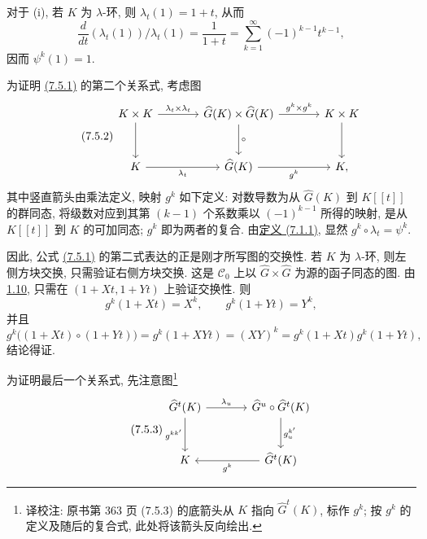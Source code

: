 对于 (i), 若 \(K\) 为 \(\lambda\)-环, 则 \(\lambda_t(1)=1+t\), 从而
\[
  \frac{d}{dt}(\lambda_t(1))/\lambda_t(1)
  =
  \frac1{1+t}
  =
  \sum_{k=1}^{\infty}(-1)^{k-1}t^{k-1},
\]
因而 \(\psi^k(1)=1\).

为证明 \hyperlink{sga6.e05.eq.7-5-1}{(7.5.1)} 的第二个关系式, 考虑图
\begin{equation}\tag{7.5.2}
\begin{tikzcd}[column sep=large,row sep=large]
K\times K \arrow[r,"\lambda_t\times\lambda_t"] \arrow[d] &
\widehat G(K)\times\widehat G(K) \arrow[r,"g^k\times g^k"] \arrow[d,"\circ"] &
K\times K \arrow[d]\\
K \arrow[r,"\lambda_t"'] &
\widehat G(K) \arrow[r,"g^k"'] &
K ,
\end{tikzcd}
\end{equation}
其中竖直箭头由乘法定义, 映射 \(g^k\) 如下定义: 对数导数为从 \(\widehat G(K)\) 到 \(K[[t]]\) 的群同态, 将级数对应到其第 \((k-1)\) 个系数乘以 \((-1)^{k-1}\) 所得的映射, 是从 \(K[[t]]\) 到 \(K\) 的可加同态; \(g^k\) 即为两者的复合. 由\hyperlink{sga6.e05.eq.7-1-1}{定义 (7.1.1)}, 显然 \(g^k\circ\lambda_t=\psi^k\).

因此, 公式 \hyperlink{sga6.e05.eq.7-5-1}{(7.5.1)} 的第二式表达的正是刚才所写图的交换性. 若 \(K\) 为 \(\lambda\)-环, 则左侧方块交换, 只需验证右侧方块交换. 这是 \(\mathscr C_0\) 上以 \(\widehat G\times\widehat G\) 为源的函子同态的图. 由 \hyperlink{sga6.e05.thm.1-10}{1.10}, 只需在 \((1+Xt,1+Yt)\) 上验证交换性. 则
\[
  g^k(1+Xt)=X^k,\qquad
  g^k(1+Yt)=Y^k,
\]
并且
\[
  g^k\bigl((1+Xt)\circ(1+Yt)\bigr)
  =
  g^k(1+XYt)
  =
  (XY)^k
  =
  g^k(1+Xt)g^k(1+Yt),
\]
结论得证.

为证明最后一个关系式, 先注意图\footnote{译校注: 原书第 363 页 (7.5.3) 的底箭头从 \(K\) 指向 \(\widehat G^t(K)\), 标作 \(g^k\); 按 \(g^k\) 的定义及随后的复合式, 此处将该箭头反向绘出.}
\begin{equation}\tag{7.5.3}
\begin{tikzcd}[column sep=large,row sep=large]
\widehat G^t(K) \arrow[r,"\lambda_u"] \arrow[d,"g^{kk'}"'] &
\widehat G^u\circ\widehat G^t(K) \arrow[d,"g^{k'}_u"]\\
K & \widehat G^t(K) \arrow[l,"g^k"]
\end{tikzcd}
\end{equation}

